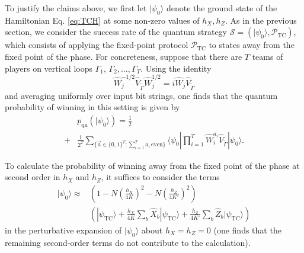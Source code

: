 \documentclass[prb,twocolumn,showpacs,amssymb,superscriptaddress]{revtex4-2}
\begin{document}
To justify the claims above, we first let $|\psi_0\rangle$ denote the  ground state of the Hamiltonian Eq. \eqref{eq:TCH} at some non-zero values of $h_X, h_Z$. As in the previous section, we consider the success rate of the quantum strategy $\mathcal{S} = (|\psi_0\rangle, \mathcal{P}_{\mathrm{TC}})$, which consists of applying the fixed-point protocol $\mathcal{P}_{\mathrm{TC}}$ to states away from the fixed point of the phase. For concreteness, suppose that there are $T$ teams of players on vertical loops $\Gamma_1, \, \Gamma_2,\ldots, \Gamma_T$. Using the identity \begin{equation}
\hat{W}_j^{-1/2} \hat{V}_{\widetilde{\Gamma}} \hat{W}_j^{1/2} = i \hat{W}_j \hat{V}_{\widetilde{\Gamma}}
\end{equation}
and averaging uniformly over input bit strings, one finds that the quantum probability of winning in this setting is given by
\begin{align}
\nonumber &p_{\mathrm{qu}}(|\psi_0\rangle) = \frac{1}{2} \\
\label{eq:TCexact}
+ &\frac{1}{2^T} \sum_{\{\vec{a} \in \{0,1\}^T : \sum_{i=1}^T a_i \, \mathrm{even}\}} \langle \psi_0 | \prod_{i=1}^T \hat{W}_i^{a_i} \hat{V}_{\widetilde{\Gamma}} | \psi_0\rangle.
\end{align}

To calculate the probability of winning away from the fixed point of the phase at second order in $h_X$ and $h_Z$, it suffices to consider the terms
\begin{align}
\nonumber |\psi_0\rangle \approx &\left(1-N\left(\frac{h_X}{4K}\right)^2 - N\left(\frac{h_Z}{4K'}\right)^2\right)\\
&\left(|\psi_{\mathrm{TC}}\rangle + \frac{h_X}{4K}\sum_b \hat{X}_b |\psi_{\mathrm{TC}}\rangle + \frac{h_Z}{4K'}\sum_b \hat{Z}_b |\psi_{\mathrm{TC}}\rangle\right)
\end{align}
in the perturbative expansion of $|\psi_0\rangle$ about $h_X=h_Z=0$ (one finds that the remaining second-order terms do not contribute to the calculation).
\end{document}
